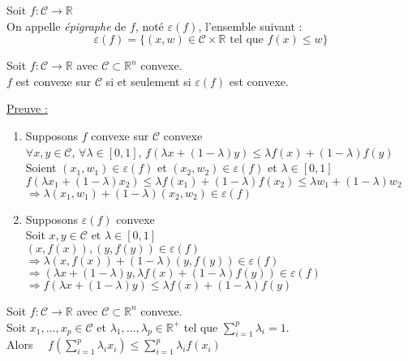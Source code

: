 \documentclass[12pt,a4paper]{article}
\newcommand{\propriete}[2]{%
    \begin{tcolorbox}[colback=white,colframe=green!25!white,title=\textbf{Propriété #1}, coltitle=black]
        #2
    \end{tcolorbox}
}
\newcommand{\definition}[2]{%
    \begin{tcolorbox}[colback=white,colframe=blue!25!white,title=\textbf{Définition #1}, coltitle=black]
        #2
    \end{tcolorbox}
}
\begin{document}
\definition{- Epigraphe}{
    Soit $f : \mathcal{C} \rightarrow \mathbb{R}$\\
    On appelle \textit{épigraphe} de $f$, noté $\varepsilon(f)$, l'ensemble suivant :\\
    $$
    \varepsilon(f) = \{(x, w) \in \mathcal{C} \times \mathbb{R} \text{ tel que } f(x) \leq w\}
    $$
}

\propriete{}{
    Soit $f : \mathcal{C} \rightarrow \mathbb{R}$ avec $\mathcal{C} \subset \mathbb{R}^n$ convexe.\\
    $f$ est convexe sur $\mathcal{C}$ si et seulement si $\varepsilon(f)$ est convexe.
}

\noindent\underline{Preuve :}
\begin{enumerate}[label=\roman*)]
    \item Supposons $f$ convexe sur $\mathcal{C}$ convexe\\
    $\forall x, y \in \mathcal{C}$, $\forall \lambda \in [0, 1]$, $f(\lambda x + (1 - \lambda) y) \leq \lambda f(x) + (1 - \lambda) f(y)$\\
    Soient $(x_1, w_1) \in \varepsilon(f)$ et $(x_2, w_2) \in \varepsilon(f)$ et $\lambda \in [0, 1]$\\
    $f(\lambda x_1 + (1 - \lambda) x_2) \leq \lambda f(x_1) + (1 - \lambda) f(x_2) \leq \lambda w_1 + (1 - \lambda) w_2$\\
    $\Rightarrow \lambda (x_1, w_1) + (1 - \lambda) (x_2, w_2) \in \varepsilon(f)$
    
    \item Supposons $\varepsilon(f)$ convexe\\
    Soit $x, y \in \mathcal{C}$ et $\lambda \in [0, 1]$\\
    $(x, f(x)), (y, f(y)) \in \varepsilon(f)$\\
    $\Rightarrow \lambda (x, f(x)) + (1 - \lambda) (y, f(y)) \in \varepsilon(f)$\\
    $\Rightarrow (\lambda x + (1 - \lambda) y, \lambda f(x) + (1 - \lambda) f(y)) \in \varepsilon(f)$\\
    $\Rightarrow f(\lambda x + (1 - \lambda) y) \leq \lambda f(x) + (1 - \lambda) f(y)$  
\end{enumerate}


\propriete{- Inégalité de Jensen}{
    Soit $f : \mathcal{C} \rightarrow \mathbb{R}$ avec $\mathcal{C} \subset \mathbb{R}^n$ convexe.\\
    Soit $x_1, \dots, x_p \in \mathcal{C}$ et $\lambda_1, \dots, \lambda_p \in \mathbb{R}^+$ tel que $\sum_{i=1}^p \lambda_i = 1$.\\

    Alors $\quad f(\sum_{i=1}^p \lambda_i x_i) \leq \sum_{i=1}^p \lambda_i f(x_i)$
}
\end{document}
